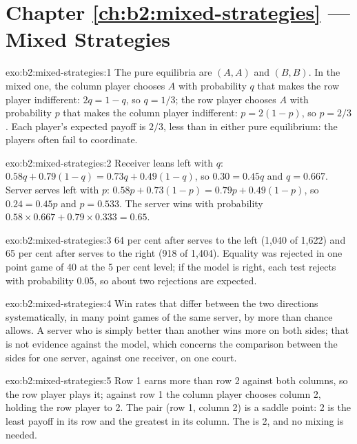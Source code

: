 \section*{Chapter \ref{ch:b2:mixed-strategies} --- Mixed Strategies}

\begin{solution}{exo:b2:mixed-strategies:1}
The pure equilibria are $(A, A)$ and $(B, B)$. In the mixed one, the column player chooses $A$ with probability $q$ that
makes the row player indifferent: $2q = 1 - q$, so $q = 1/3$; the row player chooses $A$ with probability $p$ that makes
the column player indifferent: $p = 2(1 - p)$, so $p = 2/3$. Each player's expected payoff is $2/3$, less than in
either pure equilibrium: the players often fail to coordinate.
\end{solution}

\begin{solution}{exo:b2:mixed-strategies:2}
Receiver leans left with $q$: $0.58q + 0.79(1 - q) = 0.73q + 0.49(1 - q)$, so $0.30 = 0.45q$ and $q = 0.667$. Server serves
left with $p$: $0.58p + 0.73(1 - p) = 0.79p + 0.49(1 - p)$, so $0.24 = 0.45p$ and $p = 0.533$. The server wins with
probability $0.58 \times 0.667 + 0.79 \times 0.333 = 0.65$.
\end{solution}

\begin{solution}{exo:b2:mixed-strategies:3}
64 per cent after serves to the left (1{,}040 of 1{,}622) and 65 per cent after serves to the right (918 of 1{,}404).
Equality was rejected in one point game of 40 at the 5 per cent level; if the model is right, each test rejects
with probability 0.05, so about two rejections are expected.
\end{solution}

\begin{solution}{exo:b2:mixed-strategies:4}
Win rates that differ between the two directions systematically, in many point games of the same server, by
more than chance allows. A server who is simply better than another wins more on both sides; that is not
evidence against the model, which concerns the comparison between the sides for one server, against one
receiver, on one court.
\end{solution}

\begin{solution}{exo:b2:mixed-strategies:5}
Row 1 earns more than row 2 against both columns, so the row player plays it; against row 1 the column player
chooses column 2, holding the row player to 2. The pair (row 1, column 2) is a saddle point: 2 is the least
payoff in its row and the greatest in its column. The  is 2, and no mixing is needed.
\end{solution}

